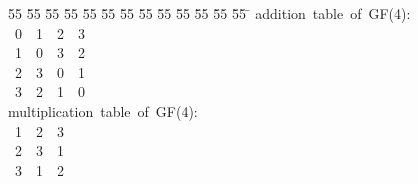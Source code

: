 %
%
\begin{tabbing}
55 \= 55 \= 55 \= 55 \= 55 \= 55 \= 55 \= 55 \= 55 \= 55 \= 55 \= 55 \= 55 \= \kill
addition\ table\ of\ GF(4):\\[0pt]
\ 0\ \ 1\ \ 2\ \ 3\ \\[0pt]
\ 1\ \ 0\ \ 3\ \ 2\ \\[0pt]
\ 2\ \ 3\ \ 0\ \ 1\ \\[0pt]
\ 3\ \ 2\ \ 1\ \ 0\ \\[0pt]
multiplication\ table\ of\ GF(4):\\[0pt]
\ 1\ \ 2\ \ 3\ \\[0pt]
\ 2\ \ 3\ \ 1\ \\[0pt]
\ 3\ \ 1\ \ 2\ \\[0pt]
\end{tabbing}
